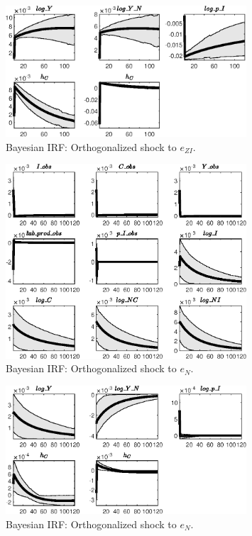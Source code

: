 \begin{figure}[H]
\centering 
\includegraphics[width=0.80\textwidth]{BRS_growth_ext_comovement/Output/BRS_growth_ext_comovement_Bayesian_IRF_e_ZI_2}
\caption{Bayesian IRF: Orthogonalized shock to ${e_{ZI}}$.}
\label{Fig:BayesianIRF:e_ZI:2}
\end{figure}
 
\begin{figure}[H]
\centering 
\includegraphics[width=0.80\textwidth]{BRS_growth_ext_comovement/Output/BRS_growth_ext_comovement_Bayesian_IRF_e_N_1}
\caption{Bayesian IRF: Orthogonalized shock to ${e_N}$.}
\label{Fig:BayesianIRF:e_N:1}
\end{figure}
 
\begin{figure}[H]
\centering 
\includegraphics[width=0.80\textwidth]{BRS_growth_ext_comovement/Output/BRS_growth_ext_comovement_Bayesian_IRF_e_N_2}
\caption{Bayesian IRF: Orthogonalized shock to ${e_N}$.}
\label{Fig:BayesianIRF:e_N:2}
\end{figure}
 

